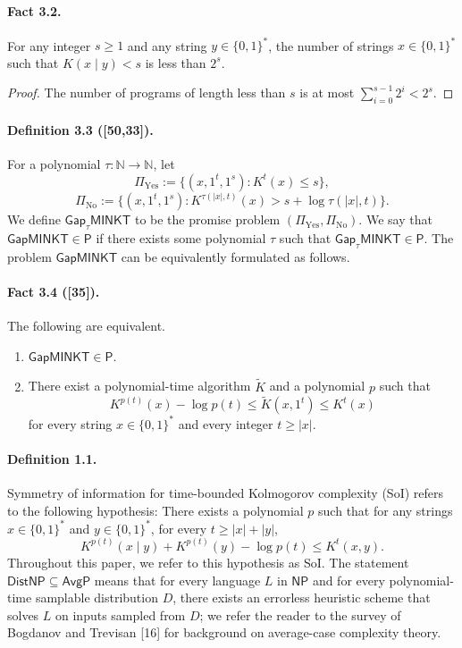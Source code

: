 \documentclass[10pt,a4paper]{article}
\begin{document}
\paragraph{Fact 3.2.}
For any integer $s\geq1$ and any string $y\in\{0,1\}^*$, the number of strings $x\in\{0,1\}^*$ such that $K(x\mid y)<s$ is less than $2^s$.
\begin{proof}
The number of programs of length less than $s$ is at most $\sum_{i=0}^{s-1}2^i<2^s$.
\end{proof}
\paragraph{Definition 3.3 ([50,33]).}
For a polynomial $\tau:\mathbb N\to\mathbb N$, let
\[\Pi_{\mathrm{Yes}}:=\{(x,1^t,1^s):K^t(x)\leq s\},\]
\[\Pi_{\mathrm{No}}:=\{(x,1^t,1^s):K^{\tau(|x|,t)}(x)>s+\log\tau(|x|,t)\}.\]
We define $\mathsf{Gap}_{\tau}\mathsf{MINKT}$ to be the promise problem $(\Pi_{\mathrm{Yes}},\Pi_{\mathrm{No}})$. We say that $\mathsf{GapMINKT}\in\mathsf P$ if there exists some polynomial $\tau$ such that $\mathsf{Gap}_{\tau}\mathsf{MINKT}\in\mathsf P$.
The problem $\mathsf{GapMINKT}$ can be equivalently formulated as follows.
\paragraph{Fact 3.4 ([35]).}
The following are equivalent.
\begin{enumerate}
\item $\mathsf{GapMINKT}\in\mathsf P$.
\item There exist a polynomial-time algorithm $\widetilde K$ and a polynomial $p$ such that
\[K^{p(t)}(x)-\log p(t)\leq\widetilde K(x,1^t)\leq K^t(x)\]
for every string $x\in\{0,1\}^*$ and every integer $t\geq|x|$.
\end{enumerate}
\paragraph{Definition 1.1.}
Symmetry of information for time-bounded Kolmogorov complexity (SoI) refers to the following hypothesis: There exists a polynomial $p$ such that for any strings $x\in\{0,1\}^*$ and $y\in\{0,1\}^*$, for every $t\geq|x|+|y|$,
\[K^{p(t)}(x\mid y)+K^{p(t)}(y)-\log p(t)\leq K^t(x,y).\tag{SoI}\]
Throughout this paper, we refer to this hypothesis as SoI.
The statement $\mathsf{DistNP}\subseteq\mathsf{AvgP}$ means that for every language $L$ in $\mathsf{NP}$ and for every polynomial-time samplable distribution $D$, there exists an errorless heuristic scheme that solves $L$ on inputs sampled from $D$; we refer the reader to the survey of Bogdanov and Trevisan [16] for background on average-case complexity theory.
\end{document}
